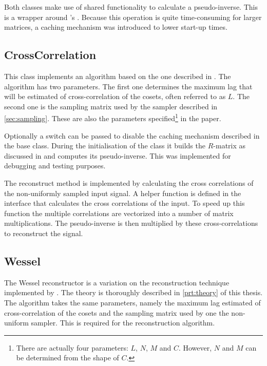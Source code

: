 \documentclass[a4paper, openany, oneside]{memoir}
\begin{document}
Both classes make use of shared functionality to calculate a pseudo-inverse. This is a wrapper around 's . Because this operation is quite time-consuming for larger matrices, a caching mechanism was introduced to lower start-up times.

\subsection{CrossCorrelation}
\label{sub:crosscorrelation}
This class implements an algorithm based on the one described in \cite{ariananda2012compressive}. The algorithm has two parameters. The first one determines the maximum lag that will be estimated of cross-correlation of the cosets, often referred to as $L$. The second one is the sampling matrix used by the sampler described in \cref{sec:sampling}. These are also the parameters specified\footnote{\label{fn:reconparam}There are actually four parameters: $L$, $N$, $M$ and $C$. However, $N$ and $M$ can be determined from the shape of $C$.} in the paper.

Optionally a switch can be passed to disable the caching mechanism described in the base class. During the initialisation of the class it builds the $R$-matrix as discussed in \cite{ariananda2012compressive} and computes its pseudo-inverse. This was implemented for debugging and testing purposes.

The reconstruct method is implemented by calculating the cross correlations of the non-uniformly sampled input signal. A helper function is defined in the \\ interface that calculates the cross correlations of the input. To speed up this function the multiple correlations are vectorized into a number of matrix multiplications. The pseudo-inverse is then multiplied by these cross-correlations to reconstruct the signal.

\subsection{Wessel}
\label{sub:wessel}
The Wessel reconstructor is a variation on the reconstruction technique implemented by . The theory is thoroughly described in \cref{prt:theory} of this thesis. The algorithm takes the same parameters, namely the maximum lag estimated of cross-correlation of the cosets and the sampling matrix used by one the non-uniform sampler. This is required for the reconstruction algorithm.
\end{document}
